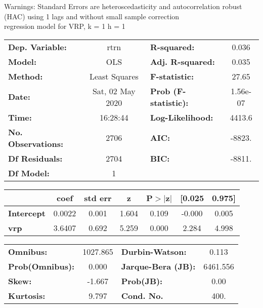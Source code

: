 Warnings: \newline
 [1] Standard Errors are heteroscedasticity and autocorrelation robust (HAC) using 1 lags and without small sample correction\\ 

regression model for VRP, k = 1 h = 1\begin{center}
\begin{tabular}{lclc}
\toprule
\textbf{Dep. Variable:}    &       rtrn       & \textbf{  R-squared:         } &     0.036   \\
\textbf{Model:}            &       OLS        & \textbf{  Adj. R-squared:    } &     0.035   \\
\textbf{Method:}           &  Least Squares   & \textbf{  F-statistic:       } &     27.65   \\
\textbf{Date:}             & Sat, 02 May 2020 & \textbf{  Prob (F-statistic):} &  1.56e-07   \\
\textbf{Time:}             &     16:28:44     & \textbf{  Log-Likelihood:    } &    4413.6   \\
\textbf{No. Observations:} &        2706      & \textbf{  AIC:               } &    -8823.   \\
\textbf{Df Residuals:}     &        2704      & \textbf{  BIC:               } &    -8811.   \\
\textbf{Df Model:}         &           1      & \textbf{                     } &             \\
\bottomrule
\end{tabular}
\begin{tabular}{lcccccc}
                   & \textbf{coef} & \textbf{std err} & \textbf{z} & \textbf{P$> |$z$|$} & \textbf{[0.025} & \textbf{0.975]}  \\
\midrule
\textbf{Intercept} &       0.0022  &        0.001     &     1.604  &         0.109        &       -0.000    &        0.005     \\
\textbf{vrp}       &       3.6407  &        0.692     &     5.259  &         0.000        &        2.284    &        4.998     \\
\bottomrule
\end{tabular}
\begin{tabular}{lclc}
\textbf{Omnibus:}       & 1027.865 & \textbf{  Durbin-Watson:     } &    0.113  \\
\textbf{Prob(Omnibus):} &   0.000  & \textbf{  Jarque-Bera (JB):  } & 6461.556  \\
\textbf{Skew:}          &  -1.667  & \textbf{  Prob(JB):          } &     0.00  \\
\textbf{Kurtosis:}      &   9.797  & \textbf{  Cond. No.          } &     400.  \\
\bottomrule
\end{tabular}
\end{center}

